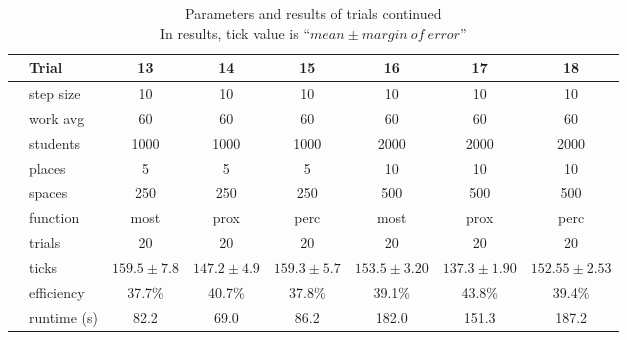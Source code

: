\documentclass[11pt]{article} %
\begin{document}
\begin{table}[]
\footnotesize
\centering
\begin{tabular}{l|l|ccc|ccc}
 & Trial & 13 & 14 & 15 & 16 & 17 & 18  \\ \hline
  \parbox[t]{2mm}{} 
 & step size 	& 10  			& 10  			& 10 			& 10 					& 10 				& 10  \\
 & work avg 	& 60 			&  60 			& 60			& 60 					& 60 				& 60 \\
 & students 	& 1000 			& 1000 			& 1000 			& 2000 					& 2000 				& 2000 \\
 & places 		& 5 			& 5 			& 5 			& 10 					& 10 				& 10 \\
 & spaces 		& 250 			& 250 			& 250 			& 500 					& 500 				& 500 \\
 & function 	& most 			& prox 			& perc 			& most 					& prox 				& perc \\
 & trials 		& 20 			& 20 			& 20 			& 20 					& 20 				& 20 \\ \hline
\parbox[t]{2mm}{} 
 & ticks 		& $159.5\pm 7.8$ 	& $147.2\pm 4.9$ 	& $159.3\pm 5.7 $	& $153.5\pm 3.20 $	& $137.3\pm 1.90 $	& $152.55\pm 2.53$ \\
 & efficiency 	& 37.7\%			& 40.7\%			& 37.8\%				& 39.1\%				& 43.8\%				& 39.4\% \\
 & runtime (s) 	& 82.2			& 69.0			& 86.2				& 182.0			& 151.3			& 187.2
\end{tabular}
\caption{Parameters and results of trials continued \\ \footnotesize In results, tick value is ``$mean \pm margin \: of \: error$''}
\end{table}




\end{document}
